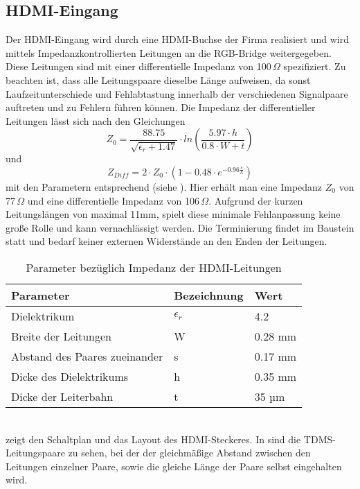 \subsection{HDMI-Eingang}
\label{cha:hdmi_eingang}
Der HDMI-Eingang wird durch eine HDMI-Buchse der Firma  realisiert und wird mittels Impedanzkontrollierten Leitungen an die RGB-Bridge weitergegeben. Diese Leitungen sind mit einer differentielle Impedanz von 100\,$\Omega$ spezifiziert. Zu beachten ist, dass alle Leitungspaare dieselbe Länge aufweisen, da sonst Laufzeitunterschiede und Fehlabtastung innerhalb der verschiedenen Signalpaare auftreten und zu Fehlern führen können. Die Impedanz der differentieller Leitungen lässt sich nach den Gleichungen 
%
\begin{equation}
Z_0 = \frac{88.75}{\sqrt{\epsilon_r + 1.47}} \cdot ln\left(\frac{5.97 \cdot h}{0.8 \cdot W + t}\right)
\label{equ:z_0}
\end{equation}
%
und
%
\begin{equation}
Z_{Diff} = 2 \cdot Z_0  \cdot \left(1-0.48 \cdot e^{-0.96\frac{s}{h}}\right)
\label{equ:z_diff}
\end{equation}
%
mit den Parametern entsprechend  (siehe \cite{TI2007}). Hier erhält man eine Impedanz $Z_0$ von 77\,$\Omega$ und eine differentielle Impedanz von 106\,$\Omega$. Aufgrund der kurzen Leitungslängen von maximal 11mm, spielt diese minimale Fehlanpassung keine große Rolle und kann vernachlässigt werden. Die Terminierung findet im Baustein statt und bedarf keiner externen Widerstände an den Enden der Leitungen.
\begin{table}[h]
\begin{tabular}{|p{7cm}|p{3cm}|p{3cm}|}\hline
\rowcolor{TableBackgroundColor} 
   \textbf{Parameter} & \textbf{Bezeichnung} & \textbf{Wert}	\\ \hline
    Dielektrikum 					& $\epsilon_r$	& 4.2		\\ \hline
	Breite der Leitungen  		 	& W 			& 0.28 mm	\\ \hline
	Abstand des Paares zueinander 	& s 			& 0.17 mm 	\\ \hline
	Dicke des Dielektrikums 		& h 			& 0.35 mm 	\\ \hline 
	Dicke der Leiterbahn 			& t 			& 35 µm		\\ \hline 
\end{tabular}
\caption{Parameter bezüglich Impedanz der HDMI-Leitungen}
\label{tab:z_parameter}
\end{table} \\
 zeigt den Schaltplan und das Layout des HDMI-Steckeres. In  sind die TDMS-Leitungspaare zu sehen, bei der der gleichmäßige Abstand zwischen den Leitungen einzelner Paare, sowie die gleiche Länge der Paare selbst eingehalten wird. 


